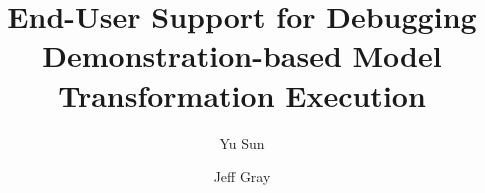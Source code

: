 
  \title{End-User Support for Debugging Demonstration-based Model Transformation Execution}

  \author{Yu Sun \and Jeff Gray}

  
\maketitle
\clearpage
\setcounter{page}{100}